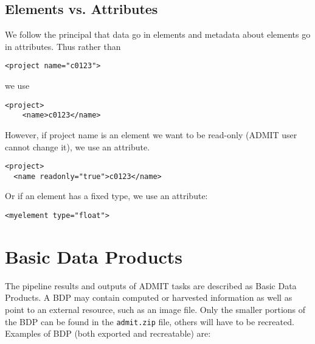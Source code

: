 \documentclass{article}
\begin{document}
\subsection{Elements vs. Attributes}
We follow the principal that data go in elements and metadata about
elements go in attributes.   Thus rather than

\begin{verbatim}
<project name="c0123">  
\end{verbatim}

\noindent we use 

\begin{verbatim}
<project>
    <name>c0123</name>
\end{verbatim}

\noindent However, if project name is an element we want to
be read-only (ADMIT user cannot change it), we use an attribute.

\begin{verbatim}
<project>
  <name readonly="true">c0123</name>
\end{verbatim}

\noindent Or if an element has a fixed type, we use an attribute:
\begin{verbatim}
<myelement type="float">
\end{verbatim}

\section{Basic Data Products}

The pipeline results and outputs of ADMIT tasks are described as 
Basic Data Products. A BDP may contain computed or harvested information
as well as point to an external resource, such as an image file.
Only the smaller portions of the BDP can be found
in the {\tt admit.zip} file, others will have to be recreated. 
%
Examples of BDP (both exported and recreatable) are:
\end{document}
